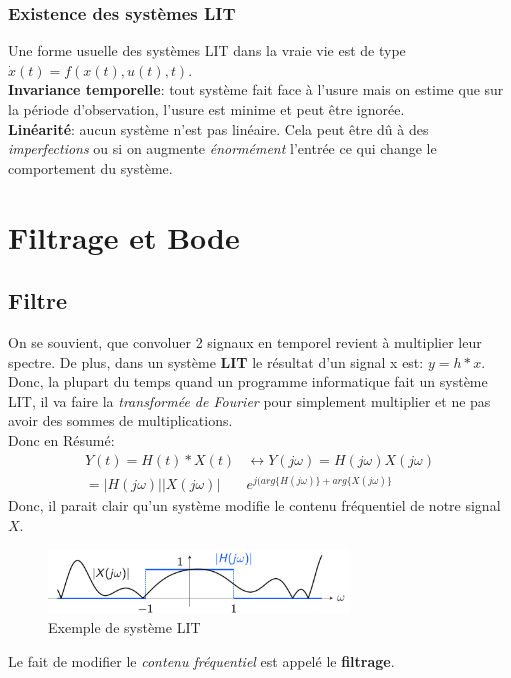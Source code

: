 \documentclass{report}
\begin{document}
\subsection{Existence des systèmes LIT}
Une forme usuelle des systèmes LIT dans la vraie vie est de type $\dot{x}(t) = f(x(t), u(t), t)$.\\
\textbf{Invariance temporelle}: tout système fait face à l'usure mais on estime que sur la période d'observation, l'usure est minime et peut être ignorée.\\
\textbf{Linéarité}: aucun système n'est pas linéaire. Cela peut être dû à des \textit{imperfections} ou si on augmente \textit{énormément} l'entrée ce qui change le comportement du système.\\

\chapter{Filtrage et Bode}

\section{Filtre}
On se souvient, que convoluer 2 signaux en temporel revient à multiplier leur spectre. De plus, dans un système \textbf{LIT} le résultat d'un signal x est: $y = h\ast x$. Donc, la plupart du temps quand un programme informatique fait un système LIT, il va faire la \textit{transformée de Fourier} pour simplement multiplier et ne pas avoir des sommes de multiplications.\\
Donc en Résumé:
\begin{align*}
Y(t) = H(t) \ast X(t) &\longleftrightarrow Y(j\omega) = H(j \omega) X(j \omega)\\
=|H(j \omega)||X(j \omega)|&e^{j(arg\{H(j\omega )\}+ arg\{X(j \omega) \}}
\end{align*}
Donc, il parait clair qu'un système modifie le contenu fréquentiel de notre signal $X$.
\begin{figure}[H]
\centering
\includegraphics[width=8cm]{img/signalFreq.png}
\caption{Exemple de système LIT}
\end{figure}
Le fait de modifier le \textit{contenu fréquentiel} est appelé le \textbf{filtrage}.
\end{document}
